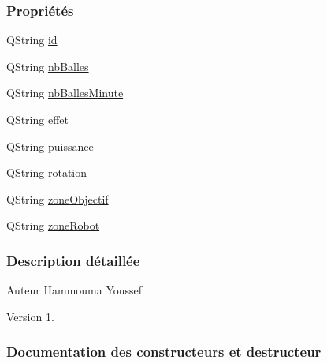 \subsubsection*{Propriétés}
\begin{DoxyCompactItemize}
\item 
Q\+String \hyperlink{class_parametre_aa60cee81cf82cba4c7b216f15adf8a80}{id}
\item 
Q\+String \hyperlink{class_parametre_a0423730a9146df04ba4de3f733818e45}{nb\+Balles}
\item 
Q\+String \hyperlink{class_parametre_a6d2be86cf41aef4e099b0a7421c735c8}{nb\+Balles\+Minute}
\item 
Q\+String \hyperlink{class_parametre_a1ac07f14fbc50b243b57246f662fe67f}{effet}
\item 
Q\+String \hyperlink{class_parametre_aace4f0265742e479043b3e2afa33771e}{puissance}
\item 
Q\+String \hyperlink{class_parametre_ab8cd796bb232cba0abe0aab5b02ae52b}{rotation}
\item 
Q\+String \hyperlink{class_parametre_a5c1b739e1a70e16ca09e6752743363aa}{zone\+Objectif}
\item 
Q\+String \hyperlink{class_parametre_a85c2e24c35cad5304b5e2edf7289c9c3}{zone\+Robot}
\end{DoxyCompactItemize}


\subsubsection{Description détaillée}
\begin{DoxyAuthor}{Auteur}
Hammouma Youssef
\end{DoxyAuthor}
\begin{DoxyVersion}{Version}
1. 
\end{DoxyVersion}


\subsubsection{Documentation des constructeurs et destructeur}
\mbox{\label{class_parametre_a8c0dee4edaf9b1222ec1b6e1d20fe9c5}} 
